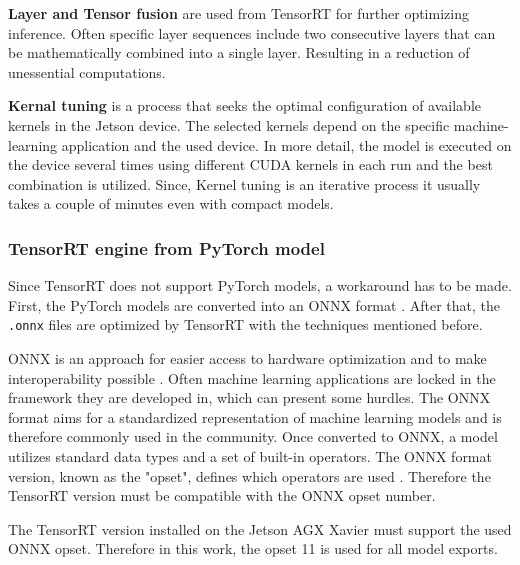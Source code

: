 \vspace{0.8cm}

\noindent\textbf{Layer and Tensor fusion} are used from TensorRT for further optimizing inference.
Often specific layer sequences include two consecutive layers that can be mathematically combined into a single layer.
Resulting in a reduction of unessential computations.

\vspace{0.8cm}

\noindent\textbf{Kernal tuning} is a process that seeks the optimal configuration of available kernels in the Jetson device.
The selected kernels depend on the specific machine-learning application and the used device.
In more detail, the model is executed on the device several times using different CUDA kernels in each run and the best combination is utilized.
Since, Kernel tuning is an iterative process it usually takes a couple of minutes even with compact models.

\subsubsection{TensorRT engine from PyTorch model}

Since TensorRT does not support PyTorch models, a workaround has to be made.
First, the PyTorch models are converted into an \ac{ONNX} format \cite{onnx_docu}.
After that, the \texttt{.onnx} files are optimized by TensorRT with the techniques mentioned before.

\vspace{0.8cm}

\ac{ONNX} is an approach for easier access to hardware optimization and to make interoperability possible \cite{onnx_docu}.
Often machine learning applications are locked in the framework they are developed in, which can present some hurdles.
The \ac{ONNX} format aims for a standardized representation of machine learning models and is therefore commonly used in the community.
Once converted to ONNX, a model utilizes standard data types and a set of built-in operators.
The \ac{ONNX} format version, known as the "opset", defines which operators are used \cite{onnx_docu}.
Therefore the TensorRT version must be compatible with the \ac{ONNX} opset number.

\vspace{0.8cm}

The TensorRT version installed on the Jetson AGX Xavier must support the used \ac{ONNX} opset.
Therefore in this work, the opset 11 is used for all model exports.

